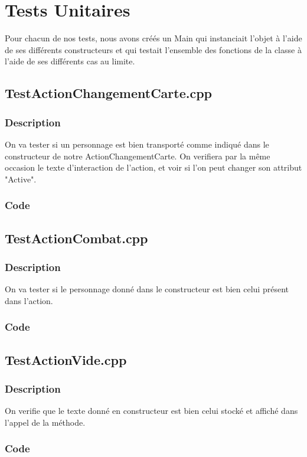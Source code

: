 \chapter{Tests Unitaires}
    Pour chacun de nos tests, nous avons créés un Main qui instanciait l'objet à l'aide de ses différents constructeurs et qui testait l'ensemble des fonctions de la classe à l'aide de ses différents cas au limite.
    \section{TestActionChangementCarte.cpp}
        \subsection{Description}
            On va tester si un personnage est bien transporté comme indiqué dans le constructeur de notre ActionChangementCarte. On verifiera par la même occasion le texte d'interaction de l'action, et voir si l'on peut changer son attribut "Active".
        \subsection{Code}
    \section{TestActionCombat.cpp}
        \subsection{Description}
            On va tester si le personnage donné dans le constructeur est bien celui présent dans l'action.
        \subsection{Code}
    \section{TestActionVide.cpp}
        \subsection{Description}
            On verifie que le texte donné en constructeur est bien celui stocké et affiché dans l'appel de la méthode.
        \subsection{Code}
